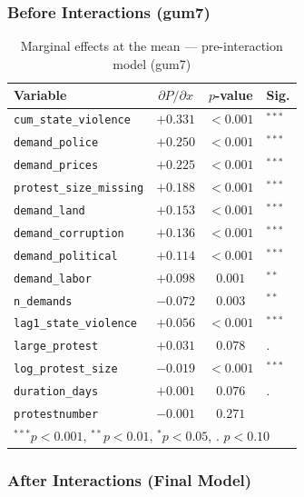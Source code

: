 \documentclass[12pt,a4paper]{article}
\begin{document}
\subsubsection{Before Interactions (gum7)}

\begin{table}[H]
\centering
\caption{Marginal effects at the mean --- pre-interaction model (gum7)}
\label{tab:mfx_before}
\begin{tabular}{lccl}
\toprule
Variable & $\partial P / \partial x$ & $p$-value & Sig. \\
\midrule
\texttt{cum\_state\_violence} & $+0.331$ & $< 0.001$ & $^{***}$ \\
\texttt{demand\_police} & $+0.250$ & $< 0.001$ & $^{***}$ \\
\texttt{demand\_prices} & $+0.225$ & $< 0.001$ & $^{***}$ \\
\texttt{protest\_size\_missing} & $+0.188$ & $< 0.001$ & $^{***}$ \\
\texttt{demand\_land} & $+0.153$ & $< 0.001$ & $^{***}$ \\
\texttt{demand\_corruption} & $+0.136$ & $< 0.001$ & $^{***}$ \\
\texttt{demand\_political} & $+0.114$ & $< 0.001$ & $^{***}$ \\
\texttt{demand\_labor} & $+0.098$ & $0.001$ & $^{**}$ \\
\texttt{n\_demands} & $-0.072$ & $0.003$ & $^{**}$ \\
\texttt{lag1\_state\_violence} & $+0.056$ & $< 0.001$ & $^{***}$ \\
\texttt{large\_protest} & $+0.031$ & $0.078$ & . \\
\texttt{log\_protest\_size} & $-0.019$ & $< 0.001$ & $^{***}$ \\
\texttt{duration\_days} & $+0.001$ & $0.076$ & . \\
\texttt{protestnumber} & $-0.001$ & $0.271$ & \\
\midrule
\multicolumn{4}{l}{\footnotesize $^{***}p<0.001$, $^{**}p<0.01$, $^{*}p<0.05$, . $p<0.10$} \\
\bottomrule
\end{tabular}
\end{table}

\subsubsection{After Interactions (Final Model)}
\end{document}
